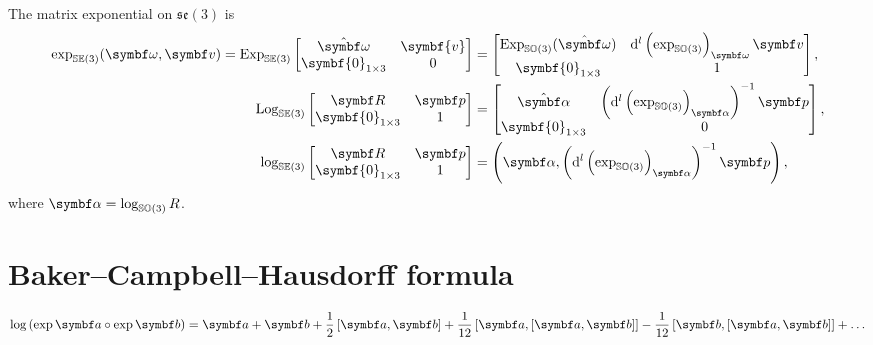 \begin{important}
  The matrix exponential on $\mathfrak{se}(3)$ is
  \begin{subequations}
    \begin{align}
      \exp_\SEthree (\bomega, \bv) = \Exp_\SEthree \begin{bmatrix}
        \hat{\bomega} & \symbf{v} \\ \symbf{0}_{1 \times 3} & 0
      \end{bmatrix} & = \begin{bmatrix}
        \Exp_{\SOthree}(\hat{\bomega}) & \mathrm{d}^l \left( \exp_{\SOthree} \right)_\bomega \symbf v \\ \symbf{0}_{1 \times 3} & 1
      \end{bmatrix},                                                                                        \\
      \Log_\SEthree \begin{bmatrix}
        \bR & \bp \\ \symbf{0}_{1 \times 3} & 1
      \end{bmatrix}                                & = \begin{bmatrix}
        \hat{\symbf \alpha} & \left( \mathrm{d}^l \left( \exp_{\SOthree} \right)_{\symbf \alpha} \right)^{-1} \bp \\ \symbf{0}_{1 \times 3} & 0
      \end{bmatrix},                                                                                        \\
      \log_\SEthree \begin{bmatrix}
        \bR & \bp \\ \symbf{0}_{1 \times 3} & 1
      \end{bmatrix}                                & = \left(\symbf \alpha, \left( \mathrm{d}^l \left( \exp_{\SOthree} \right)_{\symbf \alpha} \right)^{-1} \bp  \right),
    \end{align}
  \end{subequations}
  where $\symbf \alpha = \log_\SOthree R$.
\end{important}


\section{Baker–Campbell–Hausdorff formula}


\begin{equation}
  \label{eq:bch_formula}
  \log \left(\exp \a \circ \exp \b \right) = \a + \b + \frac{1}{2} \left[ \a, \b \right] + \frac{1}{12} \left[ \a, \left[ \a, \b \right]\right] - \frac{1}{12} \left[ \b, \left[ \a, \b \right]\right] + \ldots
\end{equation}

